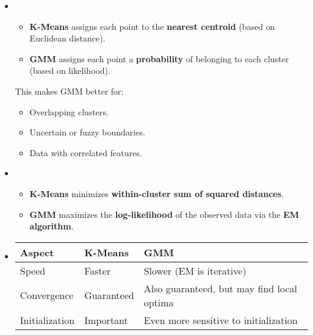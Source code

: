 \begin{itemize}
    \item {}
    \begin{itemize}
        \item \textbf{K-Means} assigns each point to the \textbf{nearest centroid} (based on Euclidean distance).
        \item \textbf{GMM} assigns each point a \textbf{probability} of belonging to each cluster (based on likelihood).
    \end{itemize}
    This makes GMM better for:
    \begin{itemize}
        \item Overlapping clusters.
        \item Uncertain or fuzzy boundaries.
        \item Data with correlated features.
    \end{itemize}


    \item {}
    \begin{itemize}
        \item \textbf{K-Means} minimizes \textbf{within-cluster sum of squared distances}.
        \item \textbf{GMM} maximizes the \textbf{log-likelihood} of the observed data via the \textbf{EM algorithm}.
    \end{itemize}


    \newpage


    \item {}
    \begin{table}[!htp]
            \centering
            \begin{tabular}{@{} l | l | l @{}}
                \toprule
                \textbf{Aspect} & \textbf{K-Means} & \textbf{GMM} \\
                \midrule
                Speed           & Faster        & Slower (EM is iterative)                      \\ [.3em]
                Convergence     & Guaranteed    & Also guaranteed, but may find local optima    \\ [.3em]
                Initialization  & Important     & Even more sensitive to initialization         \\
                \bottomrule
            \end{tabular}
    \end{table}


\end{itemize}
